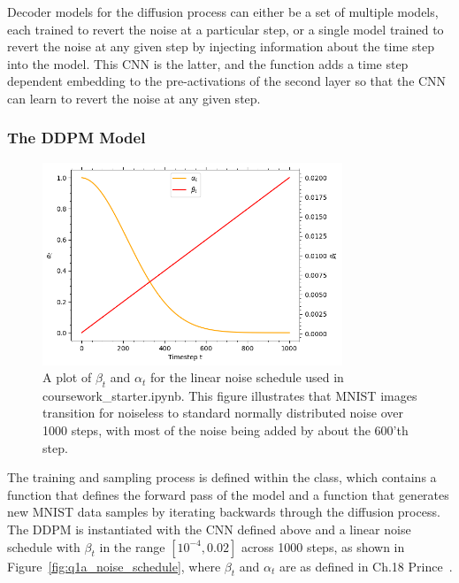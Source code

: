 Decoder models for the diffusion process can either be a set of multiple models, each trained to revert the noise at
a particular step, or a single model trained to revert the noise at any given step by injecting information about the
time step into the model.
This CNN is the latter, and the  function adds a time step dependent embedding to the pre-activations
of the second layer so that the CNN can learn to revert the noise at any given step.

\subsubsection{The DDPM Model}\label{subsubsec:ddpm-model}
\begin{figure}[t]
    \centering
    \includegraphics[width=0.8\textwidth]{figures/q1a_noise_schedule}
    \caption{A plot of $\beta_{t}$ and $\alpha_{t}$ for the linear noise schedule used in coursework\_starter.ipynb.
        This figure illustrates that MNIST images transition for noiseless to standard normally distributed noise
        over 1000 steps, with most of the noise being added by about the 600'th step.}
    \label{fig:q1a_noise_schedule}
\end{figure}

The training and sampling process is defined within the  class, which contains a 
function that defines the forward pass of the model and a
 function that generates new MNIST data samples by iterating backwards through the diffusion process.
The DDPM is instantiated with the CNN defined above and a linear noise schedule with $\beta_{t}$ in the range $[10^{-4},
0.02]$ across 1000 steps, as shown in Figure~\eqref{fig:q1a_noise_schedule}, where $\beta_{t}$ and $\alpha_{t}$ are as
defined in Ch.18 Prince~\cite{prince}.

